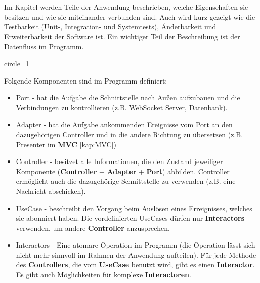 Im Kapitel werden Teile der Anwendung beschrieben, welche Eigenschaften sie besitzen und wie sie miteinander verbunden sind.
Auch wird kurz gezeigt wie die Testbarkeit (Unit-, Integration- und Systemtests), 
Änderbarkeit und Erweiterbarkeit der Software ist.    
Ein wichtiger Teil der Beschreibung ist der Datenfluss im Programm.

{circle_1}

Folgende Komponenten sind im Programm definiert:
\begin{itemize}
    \item Port - hat die Aufgabe die Schnittstelle nach Außen aufzubauen und die Verbindungen zu kontrollieren (z.B. WebSocket Server, Datenbank).
    \item Adapter  - hat die Aufgabe ankommenden Ereignisse vom Port an den dazugehörigen Controller und in die andere Richtung zu übersetzen (z.B. Presenter im \textbf{MVC} \ref{kap:MVC})
    \item Controller - besitzet alle Informationen, die den Zustand jeweiliger Komponente (\textbf{Controller} + \textbf{Adapter} + \textbf{Port}) abbilden.
    Controller ermöglicht auch die dazugehörige Schnittstelle zu verwenden (z.B. eine Nachricht abschicken).
    \item UseCase - beschreibt den Vorgang beim Auslösen eines Erreignisses, welches sie abonniert haben. Die
    vordefinierten UseCases dürfen nur \textbf{Interactors} verwenden, um andere \textbf{Controller} anzusprechen.
    \item Interactors - Eine atomare Operation im Programm (die Operation lässt sich nicht mehr sinnvoll im Rahmen
    der Anwendung aufteilen). Für jede Methode des \textbf{Controllers}, 
    die vom \textbf{UseCase} benutzt wird, gibt es einen \textbf{Interactor}. Es gibt auch Möglichkeiten für komplexe \textbf{Interactoren}.
\end{itemize}
